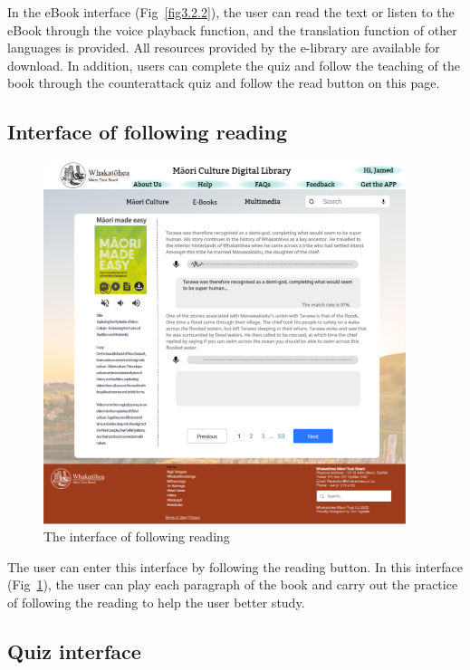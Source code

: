 In the eBook interface (Fig~\ref{fig3.2.2}), the user can read the text or listen to the eBook through the voice playback function, and the translation function of other languages is provided. All resources provided by the e-library are available for download. In addition, users can complete the quiz and follow the teaching of the book through the counterattack quiz and follow the read button on this page.

\subsection{Interface of following reading }

\begin{figure}[htbp]
  \centerline{\includegraphics[width=300pt]{images/3-2-3.png}}
  \caption{The interface of following reading}
  \label{fig3.2.3}
\end{figure}

The user can enter this interface by following the reading button. In this interface (Fig~\ref{fig3.2.3}), the user can play each paragraph of the book and carry out the practice of following the reading to help the user better study.

\subsection{Quiz interface}

